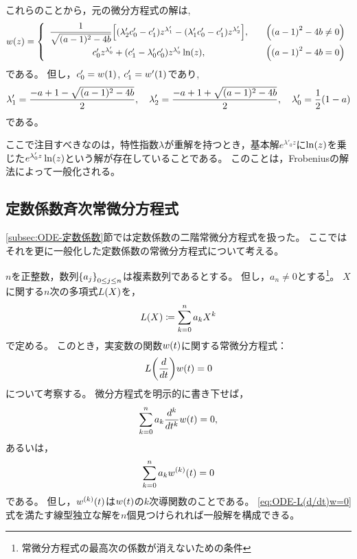 \documentclass[a4paper,draft]{ltjsarticle}
\begin{document}
これらのことから，元の微分方程式の解は,
\begin{align}
    w\pare{z}=\case{
        \begin{array}{cl}
            \dfrac{1}{\sqrt{\spare{a-1}^2-4b}}\squ{\pare{\lambda'_2c'_0-c'_1}z^{\lambda'_1}-\pare{\lambda'_1 c'_0-c'_1}z^{\lambda'_2}}, & \quad\pare{\pare{a-1}^2-4b\ne 0}
            \\
            c'_0z^{\lambda'_0}+\pare{c'_1-\lambda'_0c'_0}z^{\lambda'_0}\fun{\ln}{z},                                                         & \quad\pare{\pare{a-1}^2-4b=0}
        \end{array}
    }
\end{align}
である。
但し，$c'_0=w\pare{1}$,  $c'_1=w'\pare{1}$であり,
\begin{equation}
    \lambda'_1  =\dfrac{-a+1-\sqrt{\spare{a-1}^2-4b}}{2},
    \quad
    \lambda'_2  =\dfrac{-a+1+\sqrt{\spare{a-1}^2-4b}}{2},
    \quad
    \lambda'_0  =\dfrac{1}{2}\pare{1-a}
\end{equation}
である。

ここで注目すべきなのは，特性指数$\lambda$が重解を持つとき，基本解$e^{\lambda'_0 z}$に$\fun{\ln}{z}$を乗じた$e^{\lambda'_0 z}\fun{\ln}{z}$という解が存在していることである。
このことは，Frobeniusの解法によって一般化される。


\subsection{定数係数斉次常微分方程式}\label{subsec:ODE-定数係数斉次常微分方程式}
\ref{subsec:ODE-定数係数}節では定数係数の二階常微分方程式を扱った。
ここではそれを更に一般化した定数係数の常微分方程式について考える。

$n$を正整数，数列$\seq{a_j}{0\leq j\leq n}$は複素数列であるとする。
但し，$a_{n}\ne 0$とする\footnote{常微分方程式の最高次の係数が消えないための条件}。
$X$に関する$n$次の多項式$\fun{L}{X}$を，
\begin{equation}
    \fun{L}{X}\coloneqq \sum_{k=0}^n a_k X^k
\end{equation}
で定める。
このとき，実変数の関数$\fun{w}{t}$に関する常微分方程式：
\begin{equation}
    \fun{L}{\diff{}{t}}\fun{w}{t}=0
    \label{eq:ODE-L(d/dt)w=0}
\end{equation}
について考察する。
微分方程式を明示的に書き下せば，
\begin{equation}
    \sum_{k=0}^n a_k\diffn{}{t}{k}\fun{w}{t}=0,
\end{equation}
あるいは，
\begin{equation}
    \sum_{k=0}^n a_k\diffun{w}{k}{t}=0
\end{equation}
である。
但し，$\diffun{w}{k}{t}$は$\fun{w}{t}$の$k$次導関数のことである。
\eqref{eq:ODE-L(d/dt)w=0}式を満たす線型独立な解を$n$個見つけられれば一般解を構成できる。
\end{document}

